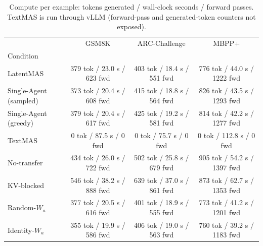 \begin{table}
\caption{Compute per example: tokens generated / wall-clock seconds / forward passes. TextMAS is run through vLLM (forward-pass and generated-token counters not exposed).}
\label{tab:compute}
\begin{tabular}{lccc}
\toprule
 & GSM8K & ARC-Challenge & MBPP+ \\
Condition &  &  &  \\
\midrule
LatentMAS & 379 tok / 23.0 s / 623 fwd & 403 tok / 18.4 s / 551 fwd & 776 tok / 44.0 s / 1222 fwd \\
Single-Agent (sampled) & 373 tok / 20.4 s / 608 fwd & 415 tok / 18.8 s / 564 fwd & 826 tok / 43.5 s / 1293 fwd \\
Single-Agent (greedy) & 379 tok / 20.4 s / 617 fwd & 425 tok / 19.2 s / 581 fwd & 814 tok / 42.2 s / 1277 fwd \\
TextMAS & 0 tok / 87.5 s / 0 fwd & 0 tok / 75.7 s / 0 fwd & 0 tok / 112.8 s / 0 fwd \\
No-transfer & 434 tok / 26.0 s / 722 fwd & 502 tok / 25.8 s / 679 fwd & 905 tok / 54.2 s / 1397 fwd \\
KV-blocked & 546 tok / 38.2 s / 888 fwd & 639 tok / 37.0 s / 861 fwd & 873 tok / 62.7 s / 1353 fwd \\
Random-$W_a$ & 377 tok / 20.5 s / 616 fwd & 401 tok / 18.9 s / 555 fwd & 773 tok / 41.2 s / 1201 fwd \\
Identity-$W_a$ & 355 tok / 19.9 s / 586 fwd & 406 tok / 19.0 s / 563 fwd & 760 tok / 39.2 s / 1183 fwd \\
\bottomrule
\end{tabular}
\end{table}
